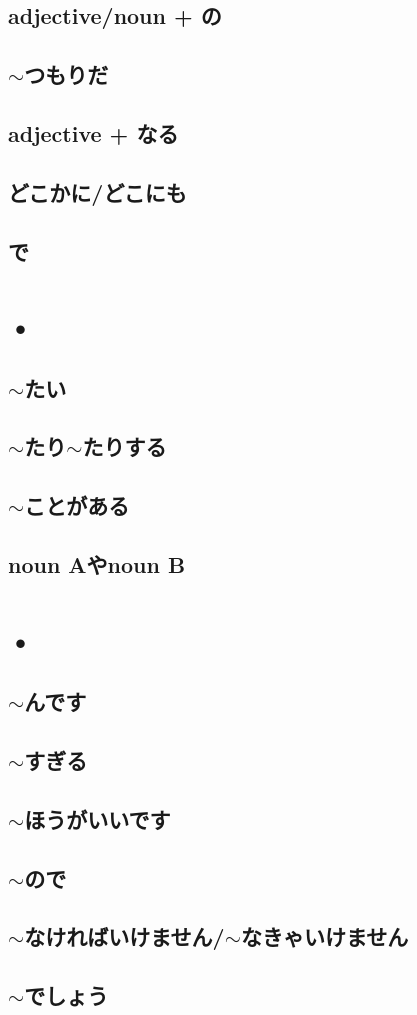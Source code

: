 \documentclass{article}
\begin{document}
   \subsection{adjective/noun + の}
   \subsection{$\sim$つもりだ}
   \subsection{adjective + なる}
   \subsection{どこかに/どこにも}
   \subsection{で}
   
   \newpage
   
   \section{•}
   \subsection{$\sim$たい}
   \subsection{$\sim$たり$\sim$たりする}
   \subsection{$\sim$ことがある}
   \subsection{noun Aやnoun B}
   
   \newpage
   
   \section{•}
   \subsection{$\sim$んです}
   \subsection{$\sim$すぎる}
   \subsection{$\sim$ほうがいいです}
   \subsection{$\sim$ので}
   \subsection{$\sim$なければいけません/$\sim$なきゃいけません}
   \subsection{$\sim$でしょう}
   
   
   
   
   
   
\end{document}
